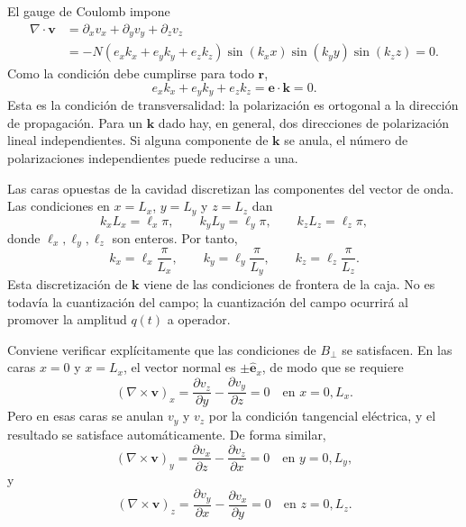\documentclass[11pt]{article}
\newcommand{\vb}[1]{\mathbf{#1}}
\newcommand{\uv}[1]{\hat{\vb e}_{#1}}
\begin{document}
El gauge de Coulomb impone
\begin{align}
  \nabla\cdot\vb v
  &=
  \partial_xv_x+\partial_yv_y+\partial_zv_z\\
  &=
  -N(e_xk_x+e_yk_y+e_zk_z)
  \sin(k_xx)\sin(k_yy)\sin(k_zz)
  =
  0.
\end{align}
Como la condici\'on debe cumplirse para todo $\vb r$,
\begin{equation}
  \boxed{
  e_xk_x+e_yk_y+e_zk_z
  =
  \vb e\cdot\vb k
  =
  0.
  }
\end{equation}
Esta es la condici\'on de transversalidad: la polarizaci\'on es ortogonal a la
direcci\'on de propagaci\'on. Para un $\vb k$ dado hay, en general, dos
direcciones de polarizaci\'on lineal independientes. Si alguna componente de
$\vb k$ se anula, el n\'umero de polarizaciones independientes puede reducirse
a una.

Las caras opuestas de la cavidad discretizan las componentes del vector de
onda. Las condiciones en $x=L_x$, $y=L_y$ y $z=L_z$ dan
\begin{equation}
  k_xL_x=\ell_x\pi,
  \qquad
  k_yL_y=\ell_y\pi,
  \qquad
  k_zL_z=\ell_z\pi,
\end{equation}
donde $\ell_x,\ell_y,\ell_z$ son enteros. Por tanto,
\begin{equation}
  \boxed{
  k_x=\ell_x\frac{\pi}{L_x},
  \qquad
  k_y=\ell_y\frac{\pi}{L_y},
  \qquad
  k_z=\ell_z\frac{\pi}{L_z}.
  }
\end{equation}
Esta discretizaci\'on de $\vb k$ viene de las condiciones de frontera de la
caja. No es todav\'ia la cuantizaci\'on del campo; la cuantizaci\'on del campo
ocurrir\'a al promover la amplitud $q(t)$ a operador.

Conviene verificar expl\'icitamente que las condiciones de $B_\perp$ se
satisfacen. En las caras $x=0$ y $x=L_x$, el vector normal es
$\pm\uv{x}$, de modo que se requiere
\begin{equation}
  (\nabla\times\vb v)_x
  =
  \frac{\partial v_z}{\partial y}
  -
  \frac{\partial v_y}{\partial z}
  =
  0
  \quad\text{en }x=0,L_x.
\end{equation}
Pero en esas caras se anulan $v_y$ y $v_z$ por la condici\'on tangencial
el\'ectrica, y el resultado se satisface autom\'aticamente. De forma similar,
\begin{equation}
  (\nabla\times\vb v)_y
  =
  \frac{\partial v_x}{\partial z}
  -
  \frac{\partial v_z}{\partial x}
  =
  0
  \quad\text{en }y=0,L_y,
\end{equation}
y
\begin{equation}
  (\nabla\times\vb v)_z
  =
  \frac{\partial v_y}{\partial x}
  -
  \frac{\partial v_x}{\partial y}
  =
  0
  \quad\text{en }z=0,L_z.
\end{equation}
\end{document}

